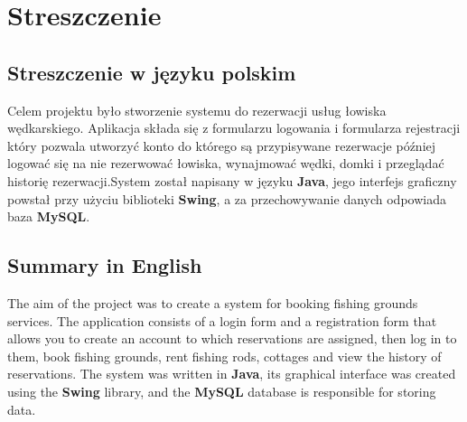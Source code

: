 \chapter{Streszczenie}
\label{chap:nowe_wprowadzenie}

\section{Streszczenie w języku polskim}
Celem projektu było stworzenie systemu do rezerwacji usług łowiska wędkarskiego. Aplikacja składa się z formularzu logowania i formularza rejestracji który pozwala utworzyć konto do którego są przypisywane rezerwacje później logować się na nie rezerwować łowiska, wynajmować wędki, domki i przeglądać historię rezerwacji.System został napisany w języku \textbf{Java}, jego interfejs graficzny powstał przy użyciu biblioteki \textbf{Swing}, a za przechowywanie danych odpowiada baza \textbf{MySQL}. 

\section{Summary in English}
The aim of the project was to create a system for booking fishing grounds services. The application consists of a login form and a registration form that allows you to create an account to which reservations are assigned, then log in to them, book fishing grounds, rent fishing rods, cottages and view the history of reservations. The system was written in \textbf{Java}, its graphical interface was created using the \textbf{Swing} library, and the \textbf{MySQL} database is responsible for storing data.